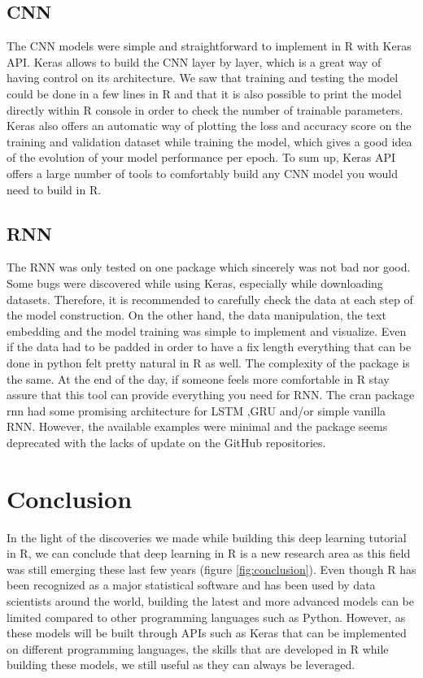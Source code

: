 \documentclass[letter,8pt]{article}\usepackage[]{graphicx}\usepackage[]{color}
\begin{document}
\subsection{CNN}
The CNN models were simple and straightforward to implement in R with Keras API. Keras allows to build the CNN layer by layer, which is a great way of having control on its architecture. We saw that training and testing the model could be done in a few lines in R and that it is also possible to print the model directly within R console in order to check the number of trainable parameters. Keras also offers an automatic way of plotting the loss and accuracy score on the training and validation dataset while training the model, which gives a good idea of the evolution of your model performance per epoch. To sum up, Keras API offers a large number of tools to comfortably build any CNN model you would need to build in R.
\subsection{RNN}
The RNN was only tested on one package which sincerely was not bad nor good. Some bugs were discovered while using Keras, especially while downloading datasets. Therefore, it is recommended to carefully check the data at each step of the model construction. On the other hand,
the data manipulation, the text embedding and the model training was simple to implement and visualize. Even if the data had to be padded in order to have a fix length everything that can be done in python felt pretty natural in R as well. The complexity of the package is the same. At the end of the day, if someone feels more comfortable in R stay assure that this tool can provide everything you need for RNN. The cran package rnn \cite{rnn2019} had some promising architecture for LSTM ,GRU and/or simple vanilla RNN. However, the available examples were minimal and the package seems deprecated with the lacks of update on the GitHub repositories.
\newpage
\section{Conclusion}
In the light of the discoveries we made while building this deep learning tutorial in R, we can conclude that deep learning in R is a new research area as this field was still emerging these last few years (figure \ref{fig:conclusion}). Even though R has been recognized as a major statistical software and has been used by data scientists around the world, building the latest and more advanced models can be limited compared to other programming languages such as Python. However, as these models will be built through APIs such as Keras that can be implemented on different programming languages, the skills that are developed in R while building these models, we still useful as they can always be leveraged.
\end{document}
